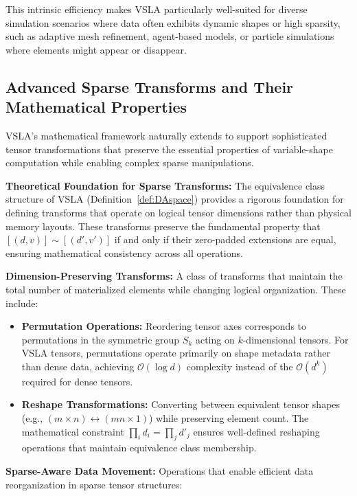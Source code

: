 This intrinsic efficiency makes VSLA particularly well-suited for diverse simulation scenarios where data often exhibits dynamic shapes or high sparsity, such as adaptive mesh refinement, agent-based models, or particle simulations where elements might appear or disappear.

\subsection{Advanced Sparse Transforms and Their Mathematical Properties}

VSLA's mathematical framework naturally extends to support sophisticated tensor transformations that preserve the essential properties of variable-shape computation while enabling complex sparse manipulations.

\textbf{Theoretical Foundation for Sparse Transforms:} The equivalence class structure of VSLA (Definition~\ref{def:DAspace}) provides a rigorous foundation for defining transforms that operate on logical tensor dimensions rather than physical memory layouts. These transforms preserve the fundamental property that $[(d,v)] \sim [(d',v')]$ if and only if their zero-padded extensions are equal, ensuring mathematical consistency across all operations.

\textbf{Dimension-Preserving Transforms:} A class of transforms that maintain the total number of materialized elements while changing logical organization. These include:

\begin{itemize}
\item \textbf{Permutation Operations:} Reordering tensor axes corresponds to permutations in the symmetric group $S_k$ acting on $k$-dimensional tensors. For VSLA tensors, permutations operate primarily on shape metadata rather than dense data, achieving $\mathcal{O}(\log d)$ complexity instead of the $\mathcal{O}(d^k)$ required for dense tensors.

\item \textbf{Reshape Transformations:} Converting between equivalent tensor shapes (e.g., $(m \times n) \leftrightarrow (mn \times 1)$) while preserving element count. The mathematical constraint $\prod_i d_i = \prod_j d'_j$ ensures well-defined reshaping operations that maintain equivalence class membership.
\end{itemize}

\textbf{Sparse-Aware Data Movement:} Operations that enable efficient data reorganization in sparse tensor structures:

